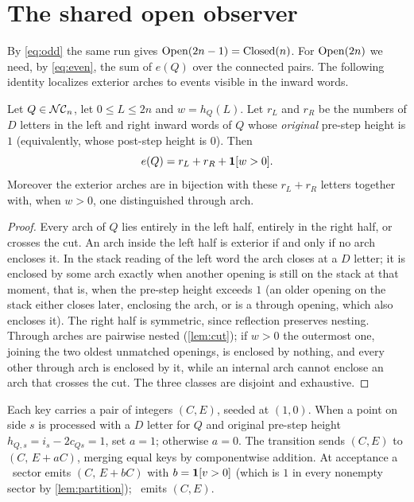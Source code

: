 \section{The shared open observer}
\label{sec:open}

By \eqref{eq:odd} the same run gives $\operatorname{Open}(2n-1)=\operatorname{Closed}(n)$. For $\operatorname{Open}(2n)$
we need, by \eqref{eq:even}, the sum of $e(Q)$ over the connected pairs. The
following identity localizes exterior arches to events visible in the inward
words.

\begin{lemma}
\label{lem:exterior}
\leanok
{}
Let $Q\in\mathcal{NC}_n$, let $0\le L\le2n$ and $w=h_Q(L)$. Let $r_L$ and $r_R$ be the
numbers of $D$ letters in the left and right inward words of $Q$ whose
\emph{original} pre-step height is $1$ (equivalently, whose post-step height is
$0$). Then
\[
 e(Q)=r_L+r_R+\mathbf{1}[w>0].
\]
Moreover the exterior arches are in bijection with these $r_L+r_R$ letters
together with, when $w>0$, one distinguished through arch.
\end{lemma}

\begin{proof}
\leanok
Every arch of $Q$ lies entirely in the left half, entirely in the right half,
or crosses the cut. An arch inside the left half is exterior if and only if no
arch encloses it. In the stack reading of the left word the arch closes at a
$D$ letter; it is enclosed by some arch exactly when another opening is still
on the stack at that moment, that is, when the pre-step height exceeds $1$
(an older opening on the stack either closes later, enclosing the arch, or is a
through opening, which also encloses it). The right half is symmetric, since
reflection preserves nesting. Through arches are pairwise nested
(\cref{lem:cut}); if $w>0$ the outermost one, joining the two oldest unmatched
openings, is enclosed by nothing, and every other through arch is enclosed by
it, while an internal arch cannot enclose an arch that crosses the cut. The
three classes are disjoint and exhaustive.
\end{proof}

\begin{definition}[Observer]
\label{def:observer}
\leanok
{}
Each key carries a pair of integers $(C,E)$, seeded at $(1,0)$. When a point on
side $s$ is processed with a $D$ letter for $Q$ and original pre-step height
$h_{Q,s}=i_s-2c_{Qs}=1$, set $a=1$; otherwise $a=0$. The transition sends
$(C,E)$ to $(C,\,E+aC)$, merging equal keys by componentwise addition. At
acceptance a \HIGH\ sector emits $(C,\,E+bC)$ with $b=\mathbf{1}[v>0]$ (which is
$1$ in every nonempty sector by \cref{lem:partition}); \LOW\ emits $(C,E)$.
\end{definition}

